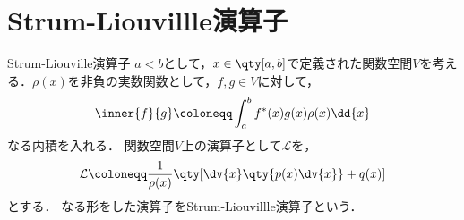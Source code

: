\documentclass{report}
\begin{document}
    \section{Strum-Liouvillle演算子}
      \begin{mydef}{Strum-Liouville演算子}{}
        $a < b$として，$x\in \qty[a, b]$で定義された関数空間$V$を考える．$\rho(x)$を非負の実数関数として，$f, g\in V$に対して，
        \begin{align}
          \inner{f}{g} \coloneqq \int_{a}^{b} f^*(x)g(x)\rho(x)\dd{x}
        \end{align}
        なる内積を入れる．
        関数空間$V$上の演算子として$\mathcal{L}$を，
        \begin{align}
          \mathcal{L} \coloneqq \frac{1}{\rho(x)}\qty[\dv{x}\qty{p(x)\dv{x}} + q(x)]\label{strum-liouville-operator-def}
        \end{align}
        とする．
        なる形をした演算子をStrum-Liouvillle演算子という．
      \end{mydef}
\end{document}
